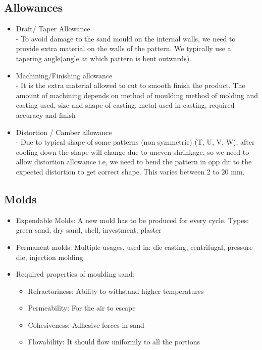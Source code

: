 \documentclass{article}
\begin{document}
\subsection{Allowances}
\begin{itemize}
	\item Draft/ Taper Allowance\\
		- To avoid damage to the sand mould on the internal walls, we need to provide extra material on the walls of the pattern. We typically use a tapering angle(angle at which pattern is bent outwards).

	\item Machining/Finishing allowance\\
		- It is the extra material allowed to cut to smooth finish the product. The amount of machining depends on method of moulding method of molding and casting used, size and shape of casting, metal used in casting, required accuracy and finish

	\item Distortion / Camber allowance\\
	 	- Due to typical shape of some patterns (non symmetric) (T, U, V, W), after cooling down the shape will change due to uneven shrinkage, so we need to allow distortion allowance i.e, we need to bend the pattern in opp dir to the expected distortion to get correct shape. This varies between 2 to 20 mm.
\end{itemize}

\subsection{Molds}
\begin{itemize}
	\item Expendable Molds: A new mold has to be produced for every cycle. Types: green sand, dry sand, shell, investment, plaster
	\item Permanent molds: Multiple usages, used in: die casting, centrifugal, pressure die, injection molding

	\item Required properties of moulding sand:
	\begin{itemize}
		\item Refractoriness: Ability to withstand higher temperatures
		\item Permeability: For the air to escape
		\item Cohesiveness: Adhesive forces in sand
		\item Flowability: It should flow uniformly to all the portions
	\end{itemize}

\end{itemize}
\end{document}

